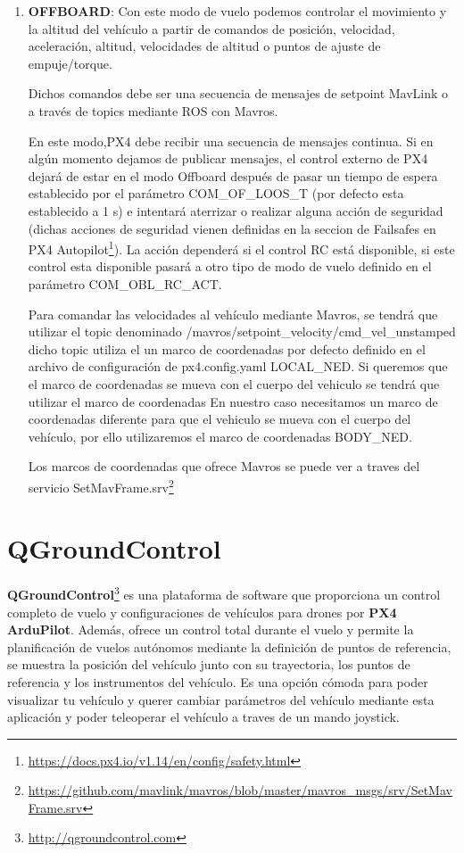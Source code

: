 \begin{enumerate}
    \item \textbf{OFFBOARD}: Con este modo de vuelo podemos controlar el movimiento y la altitud del vehículo a partir de comandos de posición, velocidad, aceleración, altitud, velocidades de 
    altitud o puntos de ajuste de empuje/torque. 

    Dichos comandos debe ser una secuencia de mensajes de setpoint MavLink o a través de topics mediante ROS con Mavros.

    En este modo,PX4 debe recibir una secuencia de mensajes continua. Si en algún momento dejamos de publicar mensajes, el control externo de PX4 dejará de estar en el modo Offboard después
    de pasar un tiempo de espera establecido por el parámetro COM\_OF\_LOOS\_T (por defecto esta establecido a 1 s) e intentará aterrizar o realizar alguna acción de seguridad (dichas acciones 
    de seguridad vienen definidas en la seccion de Failsafes en PX4 Autopilot\footnote{\url{https://docs.px4.io/v1.14/en/config/safety.html}}). La acción dependerá
    si el control RC está disponible, si este control esta disponible pasará a otro tipo de modo de vuelo definido en el parámetro COM\_OBL\_RC\_ACT. 

    Para comandar las velocidades al vehículo mediante Mavros, se tendrá que utilizar el topic denominado /mavros/setpoint\_velocity/cmd\_vel\_unstamped dicho topic utiliza el un marco de coordenadas
    por defecto definido en el archivo de configuración de px4.config.yaml  LOCAL\_NED. Si queremos que el marco de coordenadas se mueva con el 
    cuerpo del vehiculo se tendrá que utilizar el marco de coordenadas
    En nuestro caso necesitamos un marco de coordenadas diferente para que el vehiculo se mueva
    con el cuerpo del vehículo, por ello utilizaremos el marco de coordenadas BODY\_NED. 

    Los marcos de coordenadas que ofrece Mavros se puede ver a traves del servicio SetMavFrame.srv\footnote{\url{https://github.com/mavlink/mavros/blob/master/mavros_msgs/srv/SetMavFrame.srv}}
  \end{enumerate}

\section{QGroundControl}
\label{sec:QGroundControl} 

\textbf{QGroundControl}\footnote{\url{http://qgroundcontrol.com}} es una plataforma de software que proporciona un control completo de vuelo 
y configuraciones de vehículos para drones por \textbf{PX4 ArduPilot}. Además, ofrece un control total durante el vuelo y permite la planificación de vuelos autónomos 
mediante la definición de puntos de referencia, se muestra la posición del vehículo junto con su trayectoria, los puntos de referencia y los instrumentos del vehículo. 
Es una opción cómoda para poder visualizar tu vehículo y querer cambiar parámetros del vehículo mediante esta aplicación y poder teleoperar el vehículo a traves de un mando joystick. \newline

